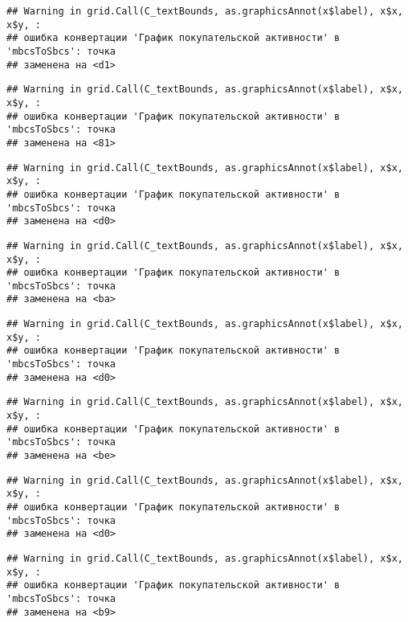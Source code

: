 \documentclass[
]{article}
\begin{document}
\begin{verbatim}
## Warning in grid.Call(C_textBounds, as.graphicsAnnot(x$label), x$x, x$y, :
## ошибка конвертации 'График покупательской активности' в 'mbcsToSbcs': точка
## заменена на <d1>
\end{verbatim}

\begin{verbatim}
## Warning in grid.Call(C_textBounds, as.graphicsAnnot(x$label), x$x, x$y, :
## ошибка конвертации 'График покупательской активности' в 'mbcsToSbcs': точка
## заменена на <81>
\end{verbatim}

\begin{verbatim}
## Warning in grid.Call(C_textBounds, as.graphicsAnnot(x$label), x$x, x$y, :
## ошибка конвертации 'График покупательской активности' в 'mbcsToSbcs': точка
## заменена на <d0>
\end{verbatim}

\begin{verbatim}
## Warning in grid.Call(C_textBounds, as.graphicsAnnot(x$label), x$x, x$y, :
## ошибка конвертации 'График покупательской активности' в 'mbcsToSbcs': точка
## заменена на <ba>
\end{verbatim}

\begin{verbatim}
## Warning in grid.Call(C_textBounds, as.graphicsAnnot(x$label), x$x, x$y, :
## ошибка конвертации 'График покупательской активности' в 'mbcsToSbcs': точка
## заменена на <d0>
\end{verbatim}

\begin{verbatim}
## Warning in grid.Call(C_textBounds, as.graphicsAnnot(x$label), x$x, x$y, :
## ошибка конвертации 'График покупательской активности' в 'mbcsToSbcs': точка
## заменена на <be>
\end{verbatim}

\begin{verbatim}
## Warning in grid.Call(C_textBounds, as.graphicsAnnot(x$label), x$x, x$y, :
## ошибка конвертации 'График покупательской активности' в 'mbcsToSbcs': точка
## заменена на <d0>
\end{verbatim}

\begin{verbatim}
## Warning in grid.Call(C_textBounds, as.graphicsAnnot(x$label), x$x, x$y, :
## ошибка конвертации 'График покупательской активности' в 'mbcsToSbcs': точка
## заменена на <b9>
\end{verbatim}
\end{document}
